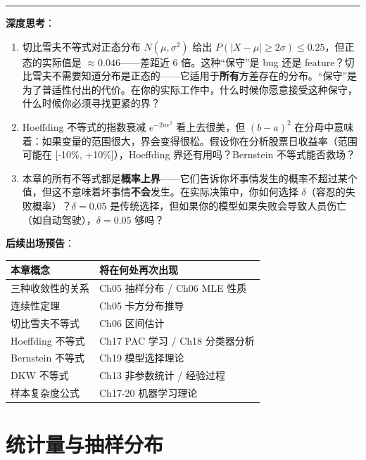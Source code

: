 \documentclass[
]{book}
\begin{document}
\begin{center}\rule{0.5\linewidth}{0.5pt}\end{center}

\textbf{深度思考}：

\begin{enumerate}
\def\labelenumi{\arabic{enumi}.}
\item
  切比雪夫不等式对正态分布 \(N(\mu,\sigma^2)\) 给出 \(P(|X-\mu| \geq 2\sigma) \leq 0.25\)，但正态的实际值是 \(\approx 0.046\)------差距近 6 倍。这种``保守''是 bug 还是 feature？切比雪夫不需要知道分布是正态的------它适用于\textbf{所有}方差存在的分布。``保守''是为了普适性付出的代价。在你的实际工作中，什么时候你愿意接受这种保守，什么时候你必须寻找更紧的界？
\item
  Hoeffding 不等式的指数衰减 \(e^{-2n\epsilon^2}\) 看上去很美，但 \((b-a)^2\) 在分母中意味着：如果变量的范围很大，界会变得很松。假设你在分析股票日收益率（范围可能在 {[}-10\%, +10\%{]}），Hoeffding 界还有用吗？Bernstein 不等式能否救场？
\item
  本章的所有不等式都是\textbf{概率上界}------它们告诉你坏事情发生的概率不超过某个值，但这不意味着坏事情\textbf{不会}发生。在实际决策中，你如何选择 \(\delta\)（容忍的失败概率）？\(\delta = 0.05\) 是传统选择，但如果你的模型如果失败会导致人员伤亡（如自动驾驶），\(\delta = 0.05\) 够吗？
\end{enumerate}

\textbf{后续出场预告}：

\begin{longtable}[]{@{}ll@{}}
\toprule\noalign{}
本章概念 & 将在何处再次出现 \\
\midrule\noalign{}
\endhead
\bottomrule\noalign{}
\endlastfoot
三种收敛性的关系 & Ch05 抽样分布 / Ch06 MLE 性质 \\
连续性定理 & Ch05 卡方分布推导 \\
切比雪夫不等式 & Ch06 区间估计 \\
Hoeffding 不等式 & Ch17 PAC 学习 / Ch18 分类器分析 \\
Bernstein 不等式 & Ch19 模型选择理论 \\
DKW 不等式 & Ch13 非参数统计 / 经验过程 \\
样本复杂度公式 & Ch17-20 机器学习理论 \\
\end{longtable}

\chapter{统计量与抽样分布}\label{ux7edfux8ba1ux91cfux4e0eux62bdux6837ux5206ux5e03}
\end{document}
